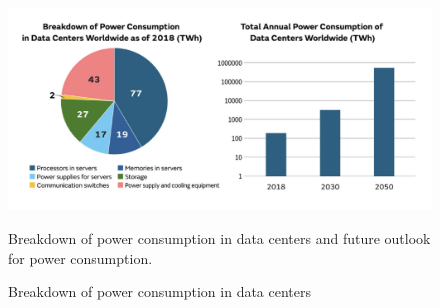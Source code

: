 \begin{figure}[H]
    \centering
    \includegraphics[scale=0.5]{fig/01/01-motivation.pdf}
    \small
    \caption{Breakdown of power consumption in data centers}
    \label{fig:01-motivation}
    \tiny
    Breakdown of power consumption in data centers and future outlook for power consumption.
\end{figure}

